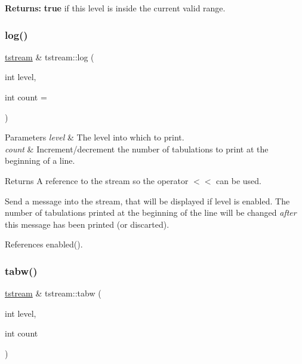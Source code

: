{\bfseries Returns\+:} {\bfseries true} if this level is inside the current valid range. \mbox{\label{clasststream_a1fe9745dc492e891a6e765e34fa082c3}} 
\subsubsection{\texorpdfstring{log()}{log()}}
{\footnotesize\ttfamily \hyperlink{clasststream}{tstream} \& tstream\+::log (\begin{DoxyParamCaption}\item[{int}]{level,  }\item[{int}]{count = {} }\end{DoxyParamCaption})\hspace{0.3cm}{\ttfamily [inline]}}


\begin{DoxyParams}{Parameters}
{\em level} & The level into which to print. \\
\hline
{\em count} & Increment/decrement the number of tabulations to print at the beginning of a line. \\
\hline
\end{DoxyParams}
\begin{DoxyReturn}{Returns}
A reference to the stream so the operator {\ttfamily $<$$<$} can be used.
\end{DoxyReturn}
Send a message into the stream, that will be displayed if {\ttfamily level} is enabled. The number of tabulations printed at the beginning of the line will be changed {\itshape after} this message has been printed (or discarted). 

References enabled().

\mbox{\label{clasststream_a5aa7a21d7b95f1bf40e68b5b13118fd0}} 
\subsubsection{\texorpdfstring{tabw()}{tabw()}}
{\footnotesize\ttfamily \hyperlink{clasststream}{tstream} \& tstream\+::tabw (\begin{DoxyParamCaption}\item[{int}]{level,  }\item[{int}]{count }\end{DoxyParamCaption})\hspace{0.3cm}{\ttfamily [inline]}}


